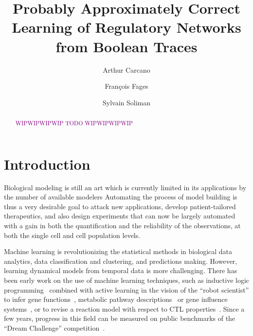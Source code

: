 \documentclass{llncs}
\newcommand{\wip}[1]{\textcolor{Purple}{WIPWIPWIPWIP #1 WIPWIPWIPWIP}}
\begin{document}
\title{Probably Approximately Correct Learning of Regulatory Networks from Boolean Traces}

\author{Arthur Carcano \and Fran\c{c}ois Fages \and Sylvain
Soliman}


\maketitle

\begin{abstract}

   \wip{TODO}

\end{abstract}

\section{Introduction}

Biological modeling is still an art which is currently limited in its applications by the number of available modelers
Automating the process of model building is thus a very desirable goal
to attack new applications, develop patient-tailored therapeutics,
and also design experiments that can now be largely automated
with a gain in both the quantification and the reliability of the observations, at both the single cell and cell population levels.

Machine learning is revolutionizing the statistical methods in biological data analytics,
data classification and clustering, and predictions making.
However, learning dynamical models from temporal data is more challenging.
There has been early work on the use of machine learning techniques, such as inductive
 logic programming~\cite{Muggleton95ngc} combined with active learning in the vision of the ``robot scientist''
to infer gene functions~\cite{BMOKRK01etai},
metabolic pathway descriptions~\cite{AM02etai,AM02slps}
or gene influence systems~\cite{BCRG04jtb},
or to revise a reaction model with respect to CTL properties~\cite{CCFS06tcsb}.
Since a few years, progress in this field can be measured on public benchmarks
of the ``Dream Challenge'' competition~\cite{Meyer14bmc}.
\end{document}
